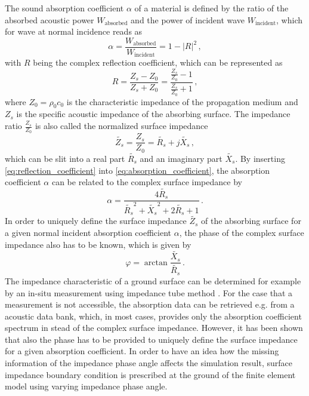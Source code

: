 The sound absorption coefficient $\alpha$ of a material is defined by the ratio of the absorbed acoustic power $W_{\text{absorbed}}$ and the power of incident wave $W_{\text{incident}}$, which for wave at normal incidence reads as
\begin{equation}
	\alpha = \frac{W_{\text{absorbed}}}{W_\text{incident}} = 1 - |R|^2\,, \label{eq:absorption_coefficient}
\end{equation}
with $R$ being the complex reflection coefficient, which can be represented as
\begin{equation}
	R = \frac{Z_s - Z_0}{Z_s + Z_0} = \frac{\frac{Z_s}{Z_0} - 1}{\frac{Z_s}{Z_0} + 1}\,, \label{eq:reflection_coefficient}
\end{equation}
where $Z_0 = \rho_0 c_0$ is the characteristic impedance of the propagation medium and $Z_s$ is the specific acoustic impedance of the absorbing surface.
The impedance ratio $\frac{Z_s}{Z_0}$ is also called the normalized surface impedance
\begin{equation}
	\tilde{Z_s} = \frac{Z_s}{Z_0} = \tilde{R_s} + j\tilde{X_s}\,,
\end{equation}
which can be slit into a real part $\tilde{R_s}$ and an imaginary part $\tilde{X_s}$. By inserting \cref{eq:reflection_coefficient} into \cref{eq:absorption_coefficient}, the absorption coefficient $\alpha$ can be related to the complex surface impedance by
\begin{equation}
	\alpha = \frac{4\tilde{R_s}}{\tilde{R_s}^2+\tilde{X_s}^2 + 2\tilde{R_s} + 1} \,. \label{eq:absorption_coefficient_2}
\end{equation}
In order to uniquely define the surface impedance $\tilde{Z_s}$ of the absorbing surface for a given normal incident absorption coefficient $\alpha$, the phase of the complex surface impedance also has to be known, which is given by
\begin{equation}
	 \varphi = \arctan{\frac{\tilde{X_s}}{\tilde{R_s}}}\,. \label{eq:impedance_phase_angle}
\end{equation}
The impedance characteristic of a ground surface can be determined for example by an in-situ measurement using impedance tube method \cite{wolkesson_2013,Seybert2008MeasurementOP}.
For the case that a measurement is not accessible, the absorption data can be retrieved e.g. from a acoustic data bank, which, in most cases, provides only the absorption coefficient spectrum in stead of the complex surface impedance.
However, it has been shown that also the phase has to be provided to uniquely define the surface impedance for a given absorption coefficient.
In order to have an idea how the missing information of the impedance phase angle affects the simulation result, surface impedance boundary condition is prescribed at the ground of the finite element model using varying impedance phase angle.

